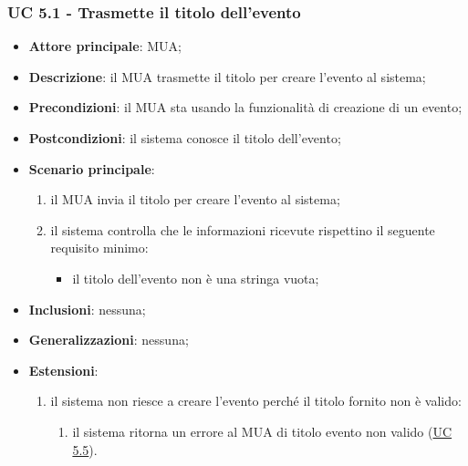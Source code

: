 \subsubsection{UC 5.1 - Trasmette il titolo dell'evento} \label{sec:UC5.1}
    \begin{itemize}
        \item \textbf{Attore principale}: MUA;
        \item \textbf{Descrizione}: il MUA trasmette il titolo per creare l'evento al sistema;
        \item \textbf{Precondizioni}: il MUA sta usando la funzionalità di creazione di un evento;
        \item \textbf{Postcondizioni}: il sistema conosce il titolo dell'evento;
        \item \textbf{Scenario principale}:
            \begin{enumerate}
                \item il MUA invia il titolo per creare l'evento al sistema;
                \item il sistema controlla che le informazioni ricevute rispettino il seguente requisito minimo:
                    \begin{itemize}
                        \item il titolo dell'evento non è una stringa vuota;
                    \end{itemize}
            \end{enumerate}
        \item \textbf{Inclusioni}: nessuna;
        \item \textbf{Generalizzazioni}: nessuna;
        \item \textbf{Estensioni}:
            \begin{enumerate}[label=\alph*.]
                \item il sistema non riesce a creare l'evento perché il titolo fornito non è valido:
                \begin{enumerate}[label=\arabic*.]
                    \item il sistema ritorna un errore al MUA di titolo evento non valido (\hyperref[sec:UC5.5]{UC 5.5}).
                \end{enumerate}
            \end{enumerate}
    \end{itemize}



